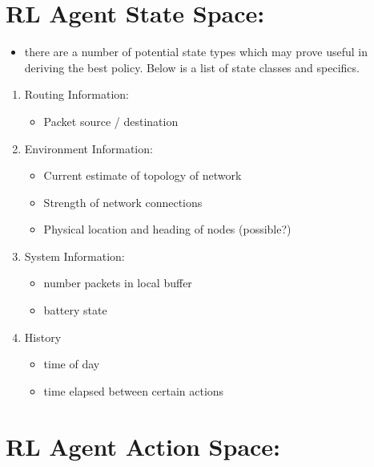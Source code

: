 \documentclass[11pt]{article}
\providecommand{\tightlist}{%
      \setlength{\itemsep}{0pt}\setlength{\parskip}{0pt}}
\begin{document}
    \hypertarget{rl-agent-state-space}{%
\section{RL Agent State Space:}\label{rl-agent-state-space}}

\begin{itemize}
\tightlist
\item
  there are a number of potential state types which may prove useful in
  deriving the best policy. Below is a list of state classes and
  specifics.
\end{itemize}

\begin{enumerate}
\def\labelenumi{\arabic{enumi}.}
\tightlist
\item
  Routing Information:

  \begin{itemize}
  \tightlist
  \item
    Packet source / destination
  \end{itemize}
\item
  Environment Information:

  \begin{itemize}
  \tightlist
  \item
    Current estimate of topology of network
  \item
    Strength of network connections
  \item
    Physical location and heading of nodes (possible?)
  \end{itemize}
\item
  System Information:

  \begin{itemize}
  \tightlist
  \item
    number packets in local buffer
  \item
    battery state
  \end{itemize}
\item
  History

  \begin{itemize}
  \tightlist
  \item
    time of day
  \item
    time elapsed between certain actions
  \end{itemize}
\end{enumerate}

    \hypertarget{rl-agent-action-space}{%
\section{RL Agent Action Space:}\label{rl-agent-action-space}}
\end{document}
